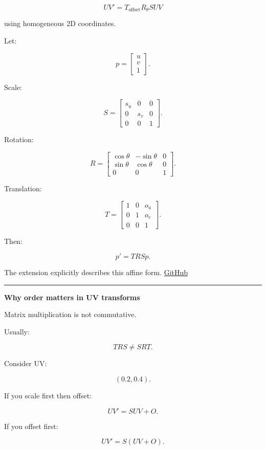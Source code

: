 \[
\boxed{
UV'
=
T_{\text{offset}}
R_{\theta}
S
UV
}
\]

using homogeneous 2D coordinates.

Let:

\[
p=
\begin{bmatrix}
u\\v\\1
\end{bmatrix}.
\]

Scale:

\[
S=
\begin{bmatrix}
s_u&0&0\\
0&s_v&0\\
0&0&1
\end{bmatrix}.
\]

Rotation:

\[
R=
\begin{bmatrix}
\cos\theta&-\sin\theta&0\\
\sin\theta&\cos\theta&0\\
0&0&1
\end{bmatrix}.
\]

Translation:

\[
T=
\begin{bmatrix}
1&0&o_u\\
0&1&o_v\\
0&0&1
\end{bmatrix}.
\]

Then:

\[
\boxed{
p'=TRSp.
}
\]

The extension explicitly describes this affine form. \href{https://github.com/KhronosGroup/glTF/blob/main/extensions/2.0/Khronos/KHR_texture_transform/README.md?utm_source=chatgpt.com}{GitHub}

\begin{center}\rule{0.5\linewidth}{0.5pt}\end{center}

\textbf{Why order matters in UV transforms}

Matrix multiplication is not commutative.

Usually:

\[
TRS
\neq
SRT.
\]

Consider UV:

\[
(0.2,0.4).
\]

If you scale first then offset:

\[
UV'=S UV+O.
\]

If you offset first:

\[
UV'=S(UV+O).
\]

